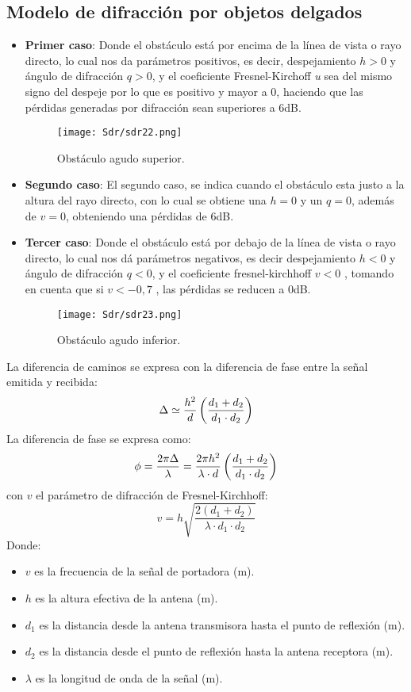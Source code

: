 \documentclass[
	12pt, %
	fleqn, %
	a4paper, %
	oneside, %
]{LegrandOrangeBook}
\begin{document}
\subsection{Modelo de difracción por objetos delgados}
\begin{itemize}
\item \textbf{Primer caso}: Donde el obstáculo está por encima de la línea de vista o rayo directo, lo cual nos da parámetros positivos, es decir, despejamiento $h > 0$ y ángulo de difracción $q > 0$, y el coeficiente Fresnel-Kirchoff \textit{u} sea del mismo signo del despeje por lo que es positivo y mayor a 0, haciendo que las pérdidas generadas por difracción sean superiores a 6dB.
\begin{figure}[H]
\centering
\texttt{[image: Sdr/sdr22.png]}
\caption{Obstáculo agudo superior.}
\end{figure}
\item \textbf{Segundo caso}: El segundo caso, se indica cuando el obstáculo esta justo a la altura del rayo directo, con lo cual se obtiene una $h=0$ y un $q = 0$, además de $v =0$, obteniendo una pérdidas de 6dB.

\item \textbf{Tercer caso}: Donde el obstáculo está por debajo de la línea de vista o rayo directo, lo cual nos dá parámetros negativos, es decir despejamiento $h < 0$ y ángulo de difracción $q < 0$, y el coeficiente fresnel-kirchhoff $v < 0$ , tomando en cuenta que si $v < -0,7$ , las pérdidas se reducen a 0dB.
\begin{figure}[H]
\centering
\texttt{[image: Sdr/sdr23.png]}
\caption{Obstáculo agudo inferior.}
\end{figure}
\end{itemize}
La diferencia de caminos se expresa con la diferencia de fase entre la señal emitida y recibida:
\begin{equation}
\Delta\simeq\frac{h^2}{d}\left(\frac{d_1+d_2}{d_1\cdot d_2}\right)
\end{equation}
La diferencia de fase se expresa como:
\begin{equation}
\phi=\frac{2\pi \Delta}{\lambda}=\frac{2\pi h^2}{\lambda\cdot d}\left(\frac{d_1+d_2}{d_1\cdot d_2}\right)
\end{equation}
con $v$ el parámetro de difracción de Fresnel-Kirchhoff:
\begin{equation}
v=h\sqrt{\frac{2(d_1+d_2)}{\lambda\cdot d_1\cdot d_2}}
\end{equation}
Donde:
\begin{itemize}
\item $v$ es la frecuencia de la señal de portadora (m).
\item $h$ es la altura efectiva de la antena (m).
\item $d_1$ es la distancia desde la antena transmisora hasta el punto de reflexión (m).
\item $d_2$ es la distancia desde el punto de reflexión hasta la antena receptora (m).
\item $\lambda$ es la longitud de onda de la señal (m).
\end{itemize}
\end{document}
